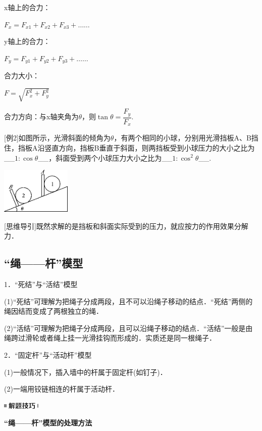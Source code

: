 \documentclass[cn,10.5pt,chinese,mac,chinesefont=founder]{elegantbook}
\begin{document}
x轴上的合力：

$F_x=F_{x1}+F_{x2}+F_{x3}+\ldots\ldots{}$

y轴上的合力：

$F_y=F_{y1}+F_{y2}+F_{y3}+\ldots\ldots{}$

合力大小：

$F=\sqrt{F_x^2+F_y^2}$

合力方向：与x轴夹角为$\theta$，则$\tan \theta=\dfrac{F_y}{F_x}$.

{[}例2{]}如图所示，光滑斜面的倾角为$\theta$，有两个相同的小球，分别用光滑挡板A、B挡住，挡板A沿竖直方向，挡板B垂直于斜面，则两挡板受到小球压力的大小之比为\_\_$1:\cos\theta$\_\_，斜面受到两个小球压力大小之比为\_\_$1:\cos^2\theta$\_\_.

\begin{center}\includegraphics[width=1.3125in,height=0.86458in]{media/image73.png}\end{center}

{[}思维导引{]}既然求解的是挡板和斜面实际受到的压力，就应按力的作用效果分解力．

\subsection{``绳------杆''模型}

1．``死结''与``活结''模型

(1)``死结''可理解为把绳子分成两段，且不可以沿绳子移动的结点．``死结''两侧的绳因结而变成了两根独立的绳．

(2)``活结''可理解为把绳子分成两段，且可以沿绳子移动的结点．``活结''一般是由绳跨过滑轮或者绳上挂一光滑挂钩而形成的．实质还是同一根绳子．

2．``固定杆''与``活动杆''模型

(1)一般情况下，插入墙中的杆属于固定杆(如钉子)．

(2)一端用铰链相连的杆属于活动杆．

\begin{center}\includegraphics[width=0.70833in,height=0.125in]{media/image37.png}

\textbf{``绳------杆''模型的处理方法}
\end{center}
\end{document}

